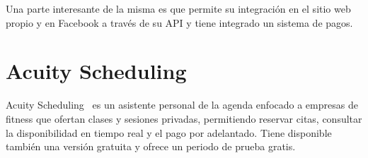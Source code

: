 Una parte interesante de la misma es que permite su integración en el sitio web propio y en Facebook a través de su API y tiene integrado un sistema de pagos.

\section{Acuity Scheduling}
Acuity Scheduling~\cite{pagina_acuity} es un asistente personal de la agenda enfocado a empresas de fitness que ofertan clases y sesiones privadas, permitiendo reservar citas, consultar la disponibilidad en tiempo real y el pago por adelantado. Tiene disponible también una versión gratuita y ofrece un periodo de prueba gratis.
